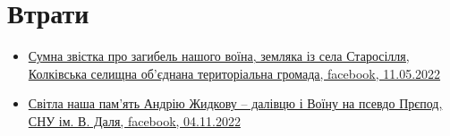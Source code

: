  
 
 
 
 
\section{Втрати}
\label{sec:topics.vojna.vtraty}







\begin{itemize} %

\item \hyperlink{11_05_2022.fb.kolky.rada.org.ua.1.smert_mosijchuk_ivan_ivanovich}{%
Сумна звістка про загибель нашого воїна, земляка із села Старосілля, %
Колківська селищна об'єднана територіальна громада, facebook, 11.05.2022%
}

\item \hyperlink{04_11_2022.fb.ua.edu.snu.1.andrij_zhidkov}{%
Світла наша пам'ять Андрію Жидкову – далівцю і Воїну на псевдо Прєпод,%
СНУ ім. В. Даля, facebook, 04.11.2022%
}

\end{itemize} %
